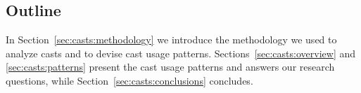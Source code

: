 \subsection*{Outline}

In Section~\ref{sec:casts:methodology} we introduce the methodology we used to analyze casts and to devise cast usage patterns.
Sections~\ref{sec:casts:overview} and \ref{sec:casts:patterns} present the cast usage patterns and answers our research questions,
while Section~\ref{sec:casts:conclusions} concludes.






